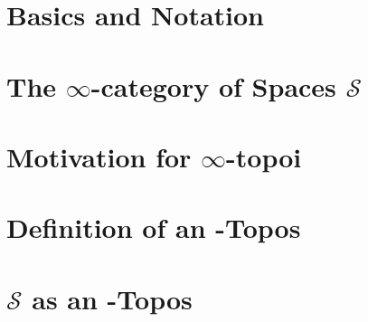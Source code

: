 \documentclass[a4paper,10pt]{scrartcl}
\theoremstyle{plain}
\newcommand{\spaces}{\mathcal{S}}
\newcommand{\inftycat}{}
\def\inftycat/{$\infty$-category}
\begin{document}
    \section{Basics and Notation}
    
    \section{The \inftycat/ of Spaces $\spaces$}
    
    \section{Motivation for $\infty$-topoi}
    \section{Definition of an \infty-Topos}
    
    \section{$\spaces$ as an \infty-Topos}
    
\end{document}
